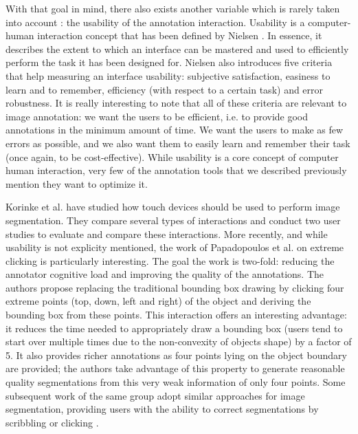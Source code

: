 With that goal in mind, there also exists another variable which is rarely taken into account : the usability of the annotation interaction. Usability is a computer-human interaction concept that has been defined by Nielsen \cite{nielsen1994usability}. In essence, it describes the extent to which an interface can be mastered and used to efficiently perform the task it has been designed for. Nielsen also introduces five criteria that help measuring an interface usability: subjective satisfaction, easiness to learn and to remember, efficiency (with respect to a certain task) and error robustness. It is really interesting to note that all of these criteria are relevant to image annotation: we want the users to be efficient, i.e. to provide good annotations in the minimum amount of time. We want the users to make as few errors as possible, and we also want them to easily learn and remember their task (once again, to be cost-effective). While usability is a core concept of computer human interaction, very few of the annotation tools that we described previously mention they want to optimize it. 


Korinke et al. \cite{korinke_intuitive_2015,korinke_exploring_2015} have studied how touch devices should be used to perform image segmentation. They compare several types of interactions and conduct two user studies to evaluate and compare these interactions. More recently, and while usability is not explicity mentioned, the work of Papadopoulos et al. \cite{papadopoulos2017extreme} on extreme clicking is particularly interesting. The goal the work is two-fold: reducing the annotator cognitive load and improving the quality of the annotations. The authors propose replacing the traditional bounding box drawing by clicking four extreme points (top, down, left and right)  of the object and deriving the bounding box from these points. This interaction offers an interesting advantage: it reduces the time needed to appropriately draw a bounding box (users tend to start over multiple times due to the non-convexity of objects shape) by a factor of 5. It also provides richer annotations as four points lying on the object boundary are provided; the authors take advantage of this property to generate reasonable quality segmentations from this very weak information of only four points. Some subsequent work of the same group adopt similar approaches for image segmentation, providing users with the ability to correct segmentations by scribbling \cite{agustsson2018interactive} or clicking \cite{OpenImagesSegmentation}.


